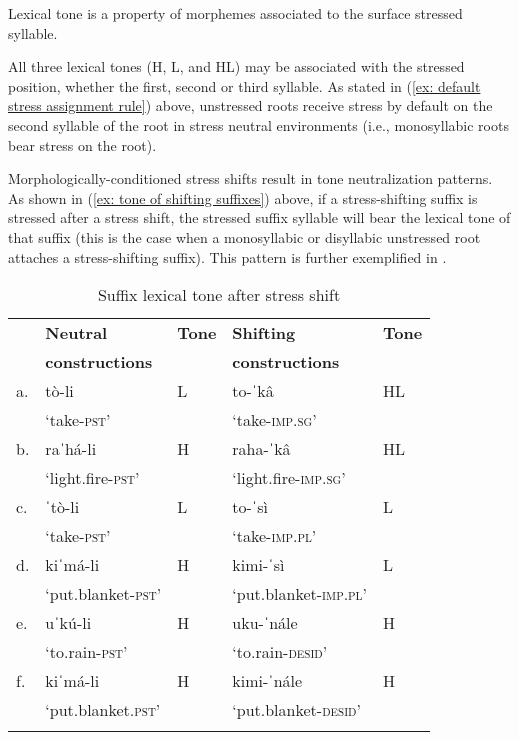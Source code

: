 \ea\label{ex: tone is a property of surface stressed syllables}
Lexical tone is a property of morphemes associated to the surface stressed syllable.
\z

All three lexical tones (H, L, and HL) may be associated with the stressed position, whether the first, second or third syllable. As stated in (\ref{ex: default stress assignment rule}) above, unstressed roots receive stress by default on the second syllable of the root in stress neutral environments (i.e., monosyllabic roots bear stress on the root).

\hspace*{-1.8pt}Morphologically-conditioned stress shifts result in tone neutralization patterns. As shown in (\ref{ex: tone of shifting suffixes}) above, if a stress-shifting suffix is stressed after a stress shift, the stressed suffix syllable will bear the lexical tone of that suffix (this is the case when a monosyllabic or disyllabic unstressed root attaches a stress-shifting suffix). This pattern is further exemplified in .

\begin{table}
\caption{Suffix lexical tone after stress shift}
\label{tab:suffix-tone}

\begin{tabularx}{\textwidth}{lQlQl}
\lsptoprule
&\textbf{Neutral} & \textbf{Tone}  & \textbf{Shifting} & \textbf{Tone}\\
& \textbf{constructions} & & \textbf{constructions} & \\
\midrule
a.& tò-li & L  & to-ˈkâ &  HL  \\
&‘take-\textsc{pst}’ &   & ‘take-\textsc{imp.sg}' &	\\
b.& raˈhá-li & H & raha-ˈkâ & HL\\
&‘light.fire-\textsc{pst}’ &   & ‘light.fire-\textsc{imp.sg}’ &	 \\
c.& ˈtò-li & L & to-ˈsì  & L \\
&‘take-\textsc{pst}’ &  & ‘take-\textsc{imp.pl}’ &  \\
d.& kiˈmá-li & H & kimi-ˈsì  & L\\
&`put.blanket-\textsc{pst}' &  & ‘put.blanket\textsc{-imp.pl}’ &  \\
e.& uˈkú-li & H &  uku-ˈnále  & H \\
&‘to.rain-\textsc{pst}' &  & ‘to.rain-\textsc{desid}' & \\
f.& kiˈmá-li & H & 	kimi-ˈnále & H\\
&‘put.blanket.\textsc{pst}' &  & ‘put.blanket-\textsc{desid}' & \\
\lspbottomrule
\end{tabularx}
\end{table}

